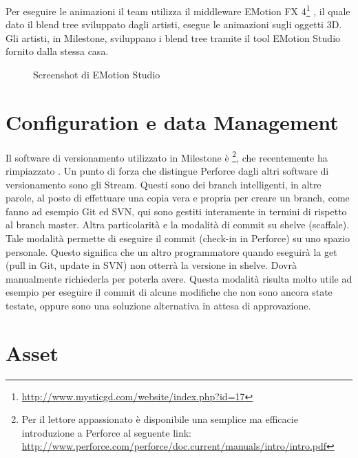 Per eseguire le animazioni il team utilizza il middleware EMotion FX 4\footnote{\url{http://www.mysticgd.com/website/index.php?id=17}} , il quale dato il blend tree sviluppato dagli artisti, esegue le animazioni sugli oggetti 3D. Gli artisti, in Milestone, sviluppano i blend tree tramite il tool EMotion Studio fornito dalla stessa casa.

\begin{figure}
	\centering
	\caption{Screenshot di EMotion Studio}
	\label{fig:screenshot-emotion-studio}
\end{figure}

\section{Configuration e data Management}

Il software di versionamento utilizzato in Milestone è \footnote{Per il lettore appassionato è disponibile una semplice ma efficacie introduzione a Perforce\textsuperscript{\textregistered} al seguente link: \url{http://www.perforce.com/perforce/doc.current/manuals/intro/intro.pdf}}, che recentemente ha rimpiazzato . Un punto di forza che distingue Perforce\textsuperscript{\textregistered} dagli altri software di versionamento sono gli Stream. Questi sono dei branch intelligenti, in altre parole, al posto di effettuare una copia vera e propria per creare un branch, come fanno ad esempio Git\textsuperscript{\textregistered} ed SVN\textsuperscript{\textregistered}, qui sono gestiti interamente in termini di  rispetto al branch master. Altra particolarità e la modalità di commit su shelve (scaffale). Tale modalità permette di eseguire il commit (check-in in Perforce\textsuperscript{\textregistered}) su uno spazio personale. Questo significa che un altro programmatore quando eseguirà la get (pull in Git\textsuperscript{\textregistered}, update in SVN\textsuperscript{\textregistered}) non otterrà la versione in shelve. Dovrà manualmente richiederla per poterla avere. Questa modalità risulta molto utile ad esempio per eseguire il commit di alcune modifiche che non sono ancora state testate, oppure sono una soluzione alternativa in attesa di approvazione.

\section{Asset}
\label{sec:asset}

